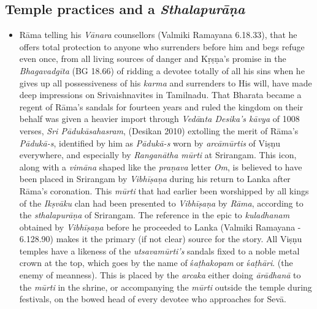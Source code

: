 \subsection*{Temple practices and a \textit{Sthalapurāṇa}}

\begin{itemize}
\item Rāma telling his \textit{Vānara} counsellors (Valmiki Ramayana 6.18.33), that he offers total protection to anyone who surrenders before him and begs refuge even once, from all living sources of danger and Kṛṣṇa’s promise in the \textit{Bhagavadgīta} (BG 18.66) of ridding a devotee totally of all his sins when he gives up all possessiveness of his \textit{karma} and surrenders to His will, have made deep impressions on Srivaishnavites in Tamilnadu. That Bharata became a regent of Rāma’s sandals for fourteen years and ruled the kingdom on their behalf was given a heavier import through \textit{Vedā}n\textit{ta Desika’s kāvya} of 1008 verses, \textit{Sri Pādukāsahasram}, (Desikan 2010) extolling the merit of Rāma’s \textit{Pādukā-s}, identified by him as \textit{Pādukā-s} worn by \textit{arcāmūrtis} of Viṣṇu everywhere, and especially by \textit{Ranganātha mūrti} at Srirangam. This icon, along with a \textit{vimāna} shaped like the \textit{praṇava} letter \textit{Om}, is believed to have been placed in Srirangam by \textit{Vibhīṣaṇa} during his return to Lanka after Rāma’s coronation. This \textit{mūrti} that had earlier been worshipped by all kings of the \textit{Ikṣvāku} clan had been presented to \textit{Vibhīṣaṇa} by \textit{Rāma}, according to the \textit{sthalapurāṇa} of Srirangam. The reference in the epic to \textit{kuladhanam} obtained by \textit{Vibhīṣaṇa} before he proceeded to Lanka (Valmiki Ramayana - 6.128.90) makes it the primary (if not clear) source for the story. All Viṣṇu temples have a likeness of the \textit{utsavamūrti’s} sandals fixed to a noble metal crown at the top, which goes by the name of ś\textit{aṭhakopam} or ś\textit{aṭhāri}. (the enemy of meanness). This is placed by the \textit{arcaka} either doing \textit{ārādhanā} to the \textit{mūrti} in the shrine, or accompanying the \textit{mūrti} outside the temple during festivals, on the bowed head of every devotee who approaches for Sevā.

\end{itemize}

